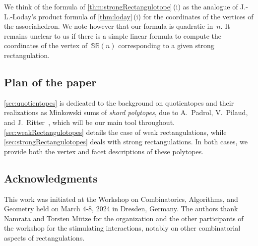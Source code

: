 \documentclass{amsart}
\theoremstyle{definition}
\newtheorem{example}[theorem]{Example}
\renewcommand{\b}[1]{{\boldsymbol{#1}}} %
\newcommand{\darkblue}{\color{darkblue}} %
\newcommand{\defn}[1]{\textsl{\darkblue #1}} %
\newcommand{\vincent}[1]{\todo[size=\scriptsize, color=blue!30]{\rm #1 \\ \hfill --- V.}}
\newcommand{\polytope}[1]{\mathds{#1}} %
\newcommand{\SRP}{\polytope{SR}} %
\begin{document}

We think of the formula of \cref{thm:strongRectangulotope}\,(i) as the analogue of J.-L.-Loday's product formula of \cref{thm:loday}\,(i) for the coordinates of the vertices of the associahedron.
We note however that our formula is quadratic in~$n$.
It remains unclear to us if there is a simple linear formula to compute the coordinates of the vertex of~$\SRP(n)$ corresponding to a given strong rectangulation.


\subsection{Plan of the paper}
\label{subsec:plan}

\cref{sec:quotientopes} is dedicated to the background on quotientopes and their realizations as Minkowski sums of \defn{shard polytopes}, due to A.~Padrol, V.~Pilaud, and J.~Ritter~\cite{MR4584712}, which will be our main tool throughout. \cref{sec:weakRectangulotopes} details the case of weak rectangulations, while \cref{sec:strongRectangulotopes} deals with strong rectangulations. In both cases, we provide both the vertex and facet descriptions of these polytopes.


\subsection*{Acknowledgments}

This work was initiated at the Workshop on Combinatorics, Algorithms, and Geometry held on March 4-8, 2024 in Dresden, Germany.
The authors thank Namrata and Torsten M\"utze for the organization and the other participants of the workshop for the stimulating interactions, notably on other combinatorial aspects of rectangulations.
\end{document}
